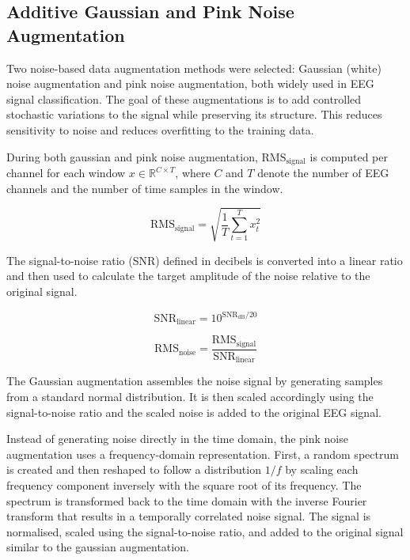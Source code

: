 \subsection{Additive Gaussian and Pink Noise Augmentation}

Two noise-based data augmentation methods were selected: Gaussian (white) noise augmentation and pink noise augmentation, both widely used in EEG signal classification. The goal of these augmentations is to add controlled stochastic variations to the signal while preserving its structure. This reduces sensitivity to noise and reduces overfitting to the training data.

During both gaussian and pink noise augmentation, $\mathrm{RMS}_{\text{signal}}$ is computed per channel for each window $x \in \mathbb{R}^{C \times T}$, where $C$ and $T$ denote the number of EEG channels and the number of time samples in the window.

\[
\mathrm{RMS}_{\text{signal}} = \sqrt{\frac{1}{T} \sum_{t=1}^{T} x_t^2}
\]

The signal-to-noise ratio (SNR) defined in decibels is converted into a linear ratio and then used to calculate the target amplitude of the noise relative to the original signal.

\[
\mathrm{SNR}_{\text{linear}} = 10^{\mathrm{SNR}_{\text{dB}} / 20}
\]

\[
\mathrm{RMS}_{\text{noise}} = \frac{\mathrm{RMS}_{\text{signal}}}{\mathrm{SNR}_{\text{linear}}}
\]


The Gaussian augmentation assembles the noise signal by generating samples from a standard normal distribution. It is then scaled accordingly using the signal-to-noise ratio and the scaled noise is added to the original EEG signal.

Instead of generating noise directly in the time domain, the pink noise augmentation uses a frequency-domain representation. First, a random spectrum is created and then reshaped to follow a distribution $1/f$ by scaling each frequency component inversely with the square root of its frequency. The spectrum is transformed back to the time domain with the inverse Fourier transform that results in a temporally correlated noise signal. The signal is normalised, scaled using the signal-to-noise ratio, and added to the original signal similar to the gaussian augmentation.

